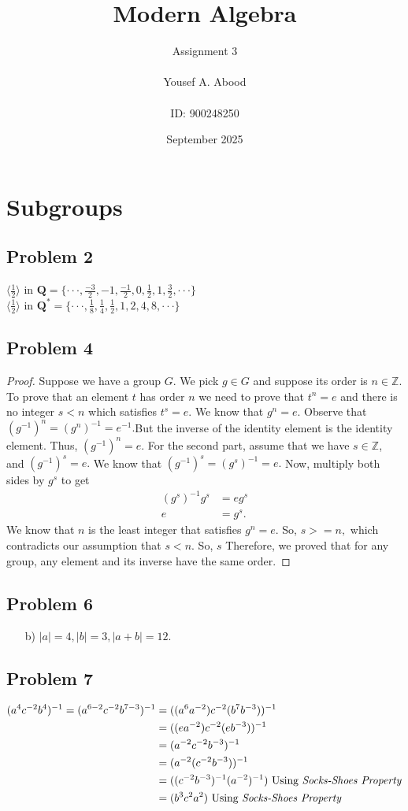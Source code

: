 \documentclass[a4paper,12pt]{article}
\title{Modern Algebra}
\author{Assignment 3\\ \\ Yousef A. Abood\\ \\ ID: 900248250}
\date{September 2025}
\begin{document}
\maketitle
\noindent\makebox[\linewidth]{\rule{15cm}{0.4pt}}
\section{Subgroups}
\subsection*{Problem 2}
$\langle \frac{1}{2} \rangle$ in $\textbf{Q}=\{\cdot\cdot\cdot, \frac{-3}{2}, -1, \frac{-1}{2}, 0, \frac{1}{2},1,\frac{3}{2}, \cdot\cdot\cdot\}$\\
$\langle \frac{1}{2} \rangle$ in $\textbf{Q}^*=\{\cdot\cdot\cdot, \frac{1}{8},\frac{1}{4},\frac{1}{2},1,2,4,8, \cdot\cdot\cdot\}$
\subsection*{Problem 4}
\begin{proof}
    Suppose we have a group $G$. We pick $g \in G$ and suppose its order is $n\in \mathbb{Z}.$ To prove that an element $t$ has order $n$ we need to prove that $t^n=e$ and there is no integer $s<n$ which satisfies $t^s=e.$ We know that $g^n=e.$ Observe that $(g^{-1})^n=(g^n)^{-1}=e^{-1}.$But the inverse of the identity element is the identity element. Thus, $(g^{-1})^n=e.$ For the second part, assume that we have $s \in \mathbb{Z}$, and $(g^{-1})^s=e.$ We know that $(g^{-1})^s=(g^s)^{-1}=e.$ Now, multiply both sides by $g^s$ to get \begin{align*}(g^s)^{-1} g^s&=eg^s\\ e&=g^s. \end{align*} 
    We know that $n$ is the least integer that satisfies $g^n=e.$ So, $s>=n,$ which contradicts our assumption that $s<n.$ So, $s$ Therefore, we proved that for any group, any element and its inverse have the same order.
\end{proof}
\subsection*{Problem 6}
\begin{itemize}
    \item [b)] $|a|=4, |b|=3, |a+b|=12.$
\end{itemize}
\subsection*{Problem 7}
\begin{align*}
    (a^4c^{-2}b^4)^{-1}=(a^{6-2}c^{-2}b^{7-3})^{-1}&=((a^6a^{-2})c^{-2}(b^7b^{-3}))^{-1}\\
    &=((ea^{-2})c^{-2}(eb^{-3}))^{-1}\\
    &=(a^{-2}c^{-2}b^{-3})^{-1}\\
    &=(a^{-2}(c^{-2}b^{-3}))^{-1}\\
    &=((c^{-2}b^{-3})^{-1}(a^{-2})^{-1}) \text{     Using \textit{Socks-Shoes Property}}\\
    &=(b^{3}c^{2}a^2) \text{     Using \textit{Socks-Shoes Property}}
\end{align*}
\end{document}
